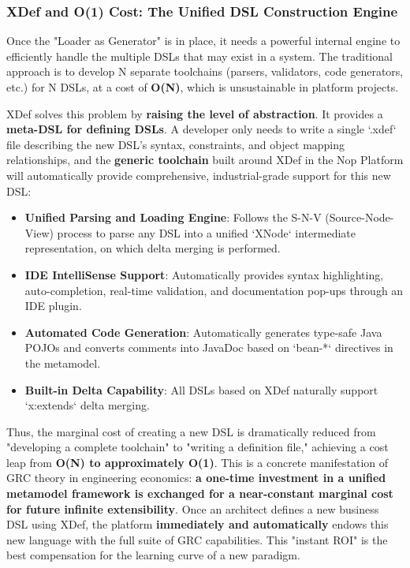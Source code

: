 \documentclass[11pt]{article}
\begin{document}
\subsubsection{XDef and O(1) Cost: The Unified DSL Construction Engine}

Once the "Loader as Generator" is in place, it needs a powerful internal engine to efficiently handle the multiple DSLs that may exist in a system. The traditional approach is to develop N separate toolchains (parsers, validators, code generators, etc.) for N DSLs, at a cost of \textbf{O(N)}, which is unsustainable in platform projects.

XDef solves this problem by \textbf{raising the level of abstraction}. It provides a \textbf{meta-DSL for defining DSLs}. A developer only needs to write a single `.xdef` file describing the new DSL's syntax, constraints, and object mapping relationships, and the \textbf{generic toolchain} built around XDef in the Nop Platform will automatically provide comprehensive, industrial-grade support for this new DSL:
\begin{itemize}
    \item \textbf{Unified Parsing and Loading Engine}: Follows the S-N-V (Source-Node-View) process to parse any DSL into a unified `XNode` intermediate representation, on which delta merging is performed.
    \item \textbf{IDE IntelliSense Support}: Automatically provides syntax highlighting, auto-completion, real-time validation, and documentation pop-ups through an IDE plugin.
    \item \textbf{Automated Code Generation}: Automatically generates type-safe Java POJOs and converts comments into JavaDoc based on `bean-*` directives in the metamodel.
    \item \textbf{Built-in Delta Capability}: All DSLs based on XDef naturally support `x:extends` delta merging.
\end{itemize}

Thus, the marginal cost of creating a new DSL is dramatically reduced from "developing a complete toolchain" to "writing a definition file," achieving a cost leap from \textbf{O(N) to approximately O(1)}. This is a concrete manifestation of GRC theory in engineering economics: \textbf{a one-time investment in a unified metamodel framework is exchanged for a near-constant marginal cost for future infinite extensibility}. Once an architect defines a new business DSL using XDef, the platform \textbf{immediately and automatically} endows this new language with the full suite of GRC capabilities. This "instant ROI" is the best compensation for the learning curve of a new paradigm.
\end{document}
